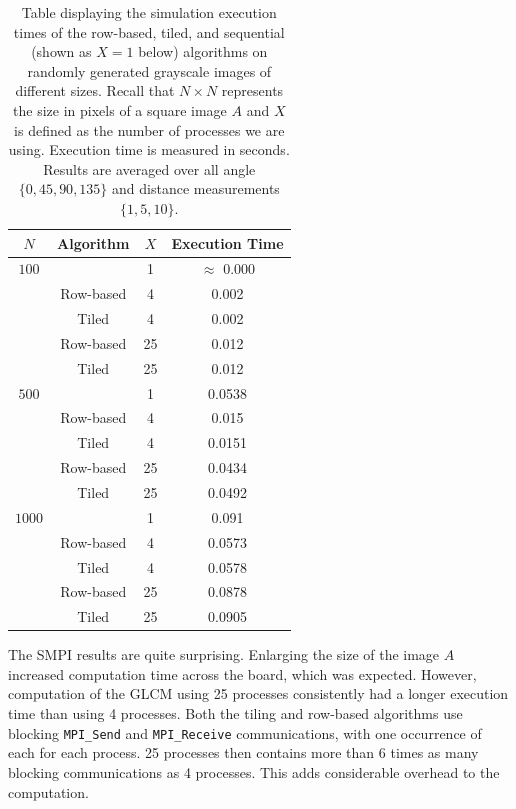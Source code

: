 \documentclass{article}
\begin{document}
    \begin{table} [t]%
      \caption{Table displaying the simulation execution times of the row-based, tiled, and sequential (shown as $X = 1$ below) algorithms on randomly generated grayscale images of different sizes. Recall that $N \times N$ represents the size in pixels of a square image $A$ and $X$ is defined as the number of processes we are using. Execution time is measured in seconds. Results are averaged over all angle $\{0, 45, 90, 135\}$ and distance measurements $\{1, 5, 10\}$. }
    \begin{tabular}{c | c c  c}
         $N $ & Algorithm & $X$ &  Execution Time\\ \hline
        $ 100  $ & & 1   & $ \approx$ 0.000 \\
        &  Row-based & 4 & 0.002 \\
        &  Tiled & 4 & 0.002 \\
        &  Row-based & 25 & 0.012 \\
        &  Tiled & 25 & 0.012 \\ \hline
        $ 500  $ & & 1   & 0.0538 \\
        &  Row-based & 4 &  0.015 \\
        &  Tiled & 4 & 0.0151 \\
        &  Row-based & 25 & 0.0434 \\
        &  Tiled & 25 & 0.0492 \\ \hline
        $ 1000  $ & & 1   & 0.091  \\
        &  Row-based & 4 & 0.0573 \\
        &  Tiled & 4 & 0.0578\\
        &  Row-based & 25 &  0.0878\\
        &  Tiled & 25 & 0.0905 
    \end{tabular}
 \label{Tab:smpi}
\end{table}
The SMPI results are quite surprising. Enlarging the size of the image $A$ increased computation time across the board, which was expected. However, computation of the GLCM using 25 processes consistently had a longer execution time than using 4 processes. Both the tiling and row-based algorithms use blocking \texttt{MPI\_Send} and \texttt{MPI\_Receive} communications, with one occurrence of each for each process. 25 processes then contains more than 6 times as many blocking communications as  4 processes. This adds considerable overhead to the computation. \\ \\ 
\end{document}
